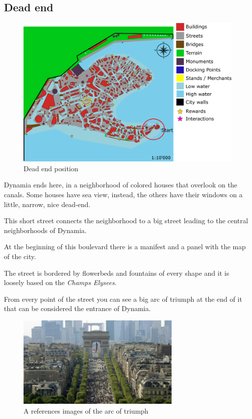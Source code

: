 \subsection{Dead end}
\begin{figure}[H]
  \centering
  \includegraphics[width=\textwidth]{Images/Maps/dynamia_deadEnd}
  \caption{Dead end position}
\end{figure}

Dynamia ends here, in a neighborhood of colored houses that overlook on the canals. Some houses have sea view, instead, the others have their windows on a little, narrow, nice dead-end.

This short street connects the neighborhood to a big street leading to the central neighborhoods of Dynamia.

At the beginning of this boulevard there is a manifest and a panel with the map of the city.

The street is bordered by flowerbeds and fountains of every shape and it is loosely based on the \textit{Champs Elysees}.

From every point of the street you can see a big arc of triumph at the end of it that can be considered the entrance of Dynamia.

\begin{figure}[H]
  \centering
  \includegraphics[width=8cm]{Images/Landmarks/arcOfTriumph}
  \caption{A references images of the arc of triumph}
\end{figure}


